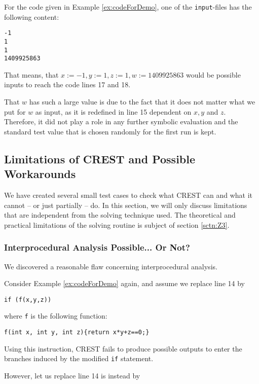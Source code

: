 \documentclass[oribibl]{llncs}
\begin{document}
For the code given in Example \ref{ex:codeForDemo}, one of the \texttt{input}-files has
the following content:
\begin{verbatim}
-1
1
1
1409925863
\end{verbatim}

That means, that $x :=-1, y:=1, z:=1, w:=1409925863$ would be possible
inputs to reach the code lines 17 and 18.

\begin{remark}
That $w$ has such a large
value is due to the fact that it does not matter what we put for $w$
as input, as it is redefined in line 15 dependent on $x,y$ and
$z$. Therefore, it did not play a role in any further symbolic
evaluation and the standard test value that is chosen randomly for the
first run is kept.
\end{remark}

\subsection{Limitations of \textsc{CREST} and Possible Workarounds}

We have created several small test cases to check what CREST can and
what it cannot -- or just partially -- do. In this section, we will only discuss
limitations that are independent from the solving technique used. The
theoretical and practical limitations of the solving routine is subject of section \ref{sctn:Z3}.

\subsubsection{Interprocedural Analysis Possible... Or Not?}

We discovered a reasonable flaw concerning interprocedural analysis.

Consider Example \ref{ex:codeForDemo} again, and assume we replace
line 14 by
\begin{verbatim}
if (f(x,y,z))
\end{verbatim}
where \texttt{f} is the following function:
\begin{verbatim}
f(int x, int y, int z){return x*y+z==0;}
\end{verbatim}

Using this instruction, \textsc{CREST} fails to produce possible
outputs to enter the branches induced by the modified \texttt{if}
statement.

However, let us replace line 14 is instead by
\end{document}
